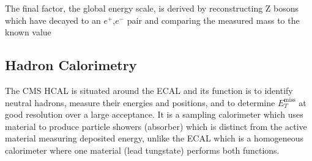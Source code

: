 The final factor, the global energy scale, is derived by reconstructing Z bosons which have decayed to an $e^{+}$,$e^{-}$ pair and comparing the measured mass to the known value














\subsection{Hadron Calorimetry}
The CMS HCAL \cite{cmsHcal} is situated around the ECAL and its function is to identify neutral hadrons, measure their energies and positions, and to determine $E_{T}^{\mathrm{miss}}$ at good resolution over a large acceptance.
It is a sampling calorimeter which uses material to produce particle showers (absorber) which is distinct from the active material measuring deposited energy, unlike the ECAL which is a homogeneous calorimeter where one material (lead tungstate) performs both functions. 

